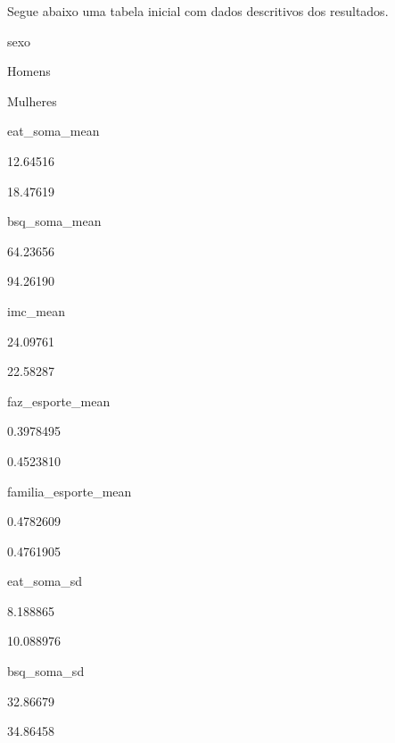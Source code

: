 \documentclass[
]{book}
\newenvironment{Shaded}{\begin{snugshade}}{\end{snugshade}}
\newcommand{\DataTypeTok}[1]{\textcolor[rgb]{0.13,0.29,0.53}{#1}}
\newcommand{\DecValTok}[1]{\textcolor[rgb]{0.00,0.00,0.81}{#1}}
\newcommand{\KeywordTok}[1]{\textcolor[rgb]{0.13,0.29,0.53}{\textbf{#1}}}
\newcommand{\NormalTok}[1]{#1}
\newcommand{\OperatorTok}[1]{\textcolor[rgb]{0.81,0.36,0.00}{\textbf{#1}}}
\newcommand{\OtherTok}[1]{\textcolor[rgb]{0.56,0.35,0.01}{#1}}
\newcommand{\StringTok}[1]{\textcolor[rgb]{0.31,0.60,0.02}{#1}}
\begin{document}
Segue abaixo uma tabela inicial com dados descritivos dos resultados.

\begin{Shaded}
\end{Shaded}

sexo

Homens

Mulheres

eat\_soma\_mean

12.64516

18.47619

bsq\_soma\_mean

64.23656

94.26190

imc\_mean

24.09761

22.58287

faz\_esporte\_mean

0.3978495

0.4523810

familia\_esporte\_mean

0.4782609

0.4761905

eat\_soma\_sd

8.188865

10.088976

bsq\_soma\_sd

32.86679

34.86458
\end{document}

